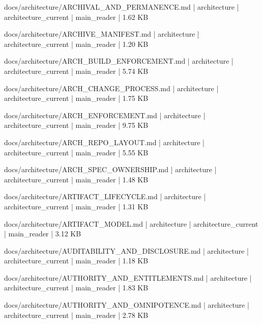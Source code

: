 \documentclass[11pt,a4paper]{report}
\begin{document}
{\small\ttfamily\raggedright docs/\allowbreak{}architecture/\allowbreak{}ARCHIVAL\_AND\_PERMANENCE.\allowbreak{}md | architecture | architecture\_current | main\_reader | 1.\allowbreak{}62 KB\par}
{\small\ttfamily\raggedright docs/\allowbreak{}architecture/\allowbreak{}ARCHIVE\_MANIFEST.\allowbreak{}md | architecture | architecture\_current | main\_reader | 1.\allowbreak{}20 KB\par}
{\small\ttfamily\raggedright docs/\allowbreak{}architecture/\allowbreak{}ARCH\_BUILD\_ENFORCEMENT.\allowbreak{}md | architecture | architecture\_current | main\_reader | 5.\allowbreak{}74 KB\par}
{\small\ttfamily\raggedright docs/\allowbreak{}architecture/\allowbreak{}ARCH\_CHANGE\_PROCESS.\allowbreak{}md | architecture | architecture\_current | main\_reader | 1.\allowbreak{}75 KB\par}
{\small\ttfamily\raggedright docs/\allowbreak{}architecture/\allowbreak{}ARCH\_ENFORCEMENT.\allowbreak{}md | architecture | architecture\_current | main\_reader | 9.\allowbreak{}75 KB\par}
{\small\ttfamily\raggedright docs/\allowbreak{}architecture/\allowbreak{}ARCH\_REPO\_LAYOUT.\allowbreak{}md | architecture | architecture\_current | main\_reader | 5.\allowbreak{}55 KB\par}
{\small\ttfamily\raggedright docs/\allowbreak{}architecture/\allowbreak{}ARCH\_SPEC\_OWNERSHIP.\allowbreak{}md | architecture | architecture\_current | main\_reader | 1.\allowbreak{}48 KB\par}
{\small\ttfamily\raggedright docs/\allowbreak{}architecture/\allowbreak{}ARTIFACT\_LIFECYCLE.\allowbreak{}md | architecture | architecture\_current | main\_reader | 1.\allowbreak{}31 KB\par}
{\small\ttfamily\raggedright docs/\allowbreak{}architecture/\allowbreak{}ARTIFACT\_MODEL.\allowbreak{}md | architecture | architecture\_current | main\_reader | 3.\allowbreak{}12 KB\par}
{\small\ttfamily\raggedright docs/\allowbreak{}architecture/\allowbreak{}AUDITABILITY\_AND\_DISCLOSURE.\allowbreak{}md | architecture | architecture\_current | main\_reader | 1.\allowbreak{}18 KB\par}
{\small\ttfamily\raggedright docs/\allowbreak{}architecture/\allowbreak{}AUTHORITY\_AND\_ENTITLEMENTS.\allowbreak{}md | architecture | architecture\_current | main\_reader | 1.\allowbreak{}83 KB\par}
{\small\ttfamily\raggedright docs/\allowbreak{}architecture/\allowbreak{}AUTHORITY\_AND\_OMNIPOTENCE.\allowbreak{}md | architecture | architecture\_current | main\_reader | 2.\allowbreak{}78 KB\par}
\end{document}
